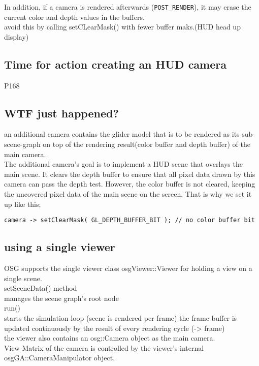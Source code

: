 \documentclass[a4paper,12pt]{book}
\begin{document}
In addition, if a camera is rendered afterwards (\verb|POST_RENDER|), it may erase the current color and depth values in the buffers.\\
\textrightarrow avoid this by calling setCLearMask() with fewer buffer maks.(HUD head up display)

\subsection{Time for action creating an HUD camera}
P168

\subsection{WTF just happened?}
an additional camera contains the glider model that is to be rendered as its sub-scene-graph on top of the rendering result(color buffer and depth buffer) of the main camera.\\
The additional camera's goal is to implement a HUD scene that overlays the main scene. It clears the depth buffer to ensure that all pixel data drawn by this camera can pass the depth test. However, the color buffer is not cleared, keeping the uncovered pixel data of the main scene on the screen. That is why we set it up like this;
\begin{lstlisting}
camera -> setClearMask( GL_DEPTH_BUFFER_BIT ); // no color buffer bit
\end{lstlisting}

\subsection{using a single viewer}

OSG supports the single viewer class osgViewer::Viewer for holding a view on a single scene.\\
setSceneData() method\\
\textrightarrow manages the scene graph's root node\\


run()\\
\textrightarrow starts the simulation loop (scene is rendered per frame)
\textrightarrow the frame buffer is updated continuously by the result of every rendering cycle (-> frame)\\

the viewer also contains an osg::Camera object as the main camera.\\
View Matrix of the camera is controlled by the viewer's internal osgGA::CameraManipulator object.\\
\end{document}
